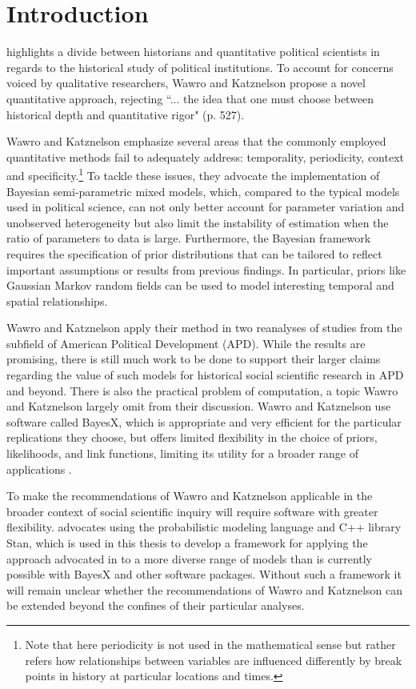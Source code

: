 \chapter{Introduction}

 highlights a divide between historians and quantitative political scientists in regards to the historical study of political institutions. To account for concerns voiced by qualitative researchers, Wawro and Katznelson propose a novel quantitative approach, rejecting ``... the idea that one must choose between historical depth and quantitative rigor" (p. 527).

Wawro and Katznelson emphasize several areas that the commonly employed quantitative methods fail to adequately address: temporality, periodicity, context and specificity.\footnote{Note that here periodicity is not used in the mathematical sense but rather refers how relationships between variables are influenced differently by break points in history at particular locations and times.}  To tackle these issues, they advocate the implementation of Bayesian semi-parametric mixed models, which, compared to the typical models used in political science, can not only better account for parameter variation and unobserved heterogeneity but also limit the instability of estimation when the ratio of parameters to data is large. Furthermore, the Bayesian framework requires the specification of prior distributions that can be tailored to reflect important assumptions or results from previous findings. In particular, priors like Gaussian Markov random fields can be used to model interesting temporal and spatial relationships. 

Wawro and Katznelson apply their method in two reanalyses of studies from the subfield of American Political Development (APD). While the results are promising, there is still much work to be done to support their larger claims regarding the value of such models for historical social scientific research in APD and beyond. There is also the practical problem of computation, a topic Wawro and Katznelson largely omit from their discussion. Wawro and Katznelson use software called BayesX, which is appropriate and very efficient for the particular replications they choose, but offers limited flexibility in the choice of priors, likelihoods, and link functions, limiting its utility for a broader range of applications . 

To make the recommendations of Wawro and Katznelson applicable in the broader context of social scientific inquiry will require software with greater flexibility.  advocates using the probabilistic modeling language and C++ library Stan, which is used in this thesis to develop a framework for applying the approach advocated in  to a more diverse range of models than is currently possible with BayesX and other software packages.  Without such a framework it will remain unclear whether the recommendations of Wawro and Katznelson can be extended beyond the confines of their particular analyses.  

